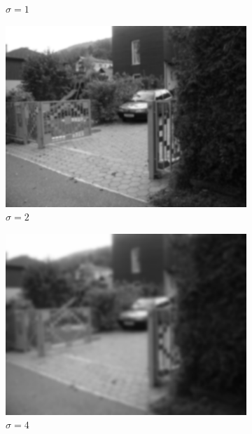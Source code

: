 \documentclass[thesis.tex]{subfiles}
\begin{document}
\begin{figure}[p]
\begin{subfigure}[t]{0.3\textwidth}
		\caption{$\sigma = 1$}
		\label{fig:scaleSpaceExample1}
	\end{subfigure}
	\begin{subfigure}[t]{0.3\textwidth}
		\includegraphics[width=\textwidth]{img/scaleSpaceTheory_2.png}
		\caption{$\sigma = 2$}
		\label{fig:scaleSpaceExample2}
	\end{subfigure}
	\begin{subfigure}[t]{0.3\textwidth}
		\includegraphics[width=\textwidth]{img/scaleSpaceTheory_4.png}
		\caption{$\sigma = 4$}
		\label{fig:scaleSpaceExample4}
	\end{subfigure}
	\begin{subfigure}[t]{0.3\textwidth}

\end{subfigure}
\end{figure}
\end{document}

